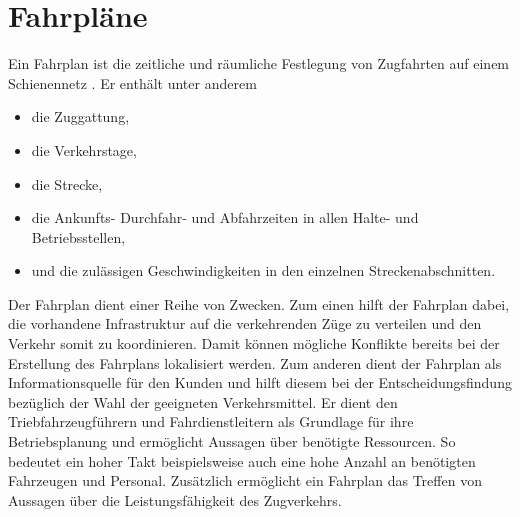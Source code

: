 \section{Fahrpläne}

Ein Fahrplan ist die zeitliche und räumliche Festlegung von Zugfahrten auf einem Schienennetz \cite{groger_simulation_2002}. Er enthält unter anderem
\begin{itemize}
    \item die Zuggattung,
    \item die Verkehrstage,
    \item die Strecke,
    \item die Ankunfts- Durchfahr- und Abfahrzeiten in allen Halte- und Betriebsstellen,
    \item und die zulässigen Geschwindigkeiten in den einzelnen Streckenabschnitten.
\end{itemize}
Der Fahrplan dient einer Reihe von Zwecken. Zum einen hilft der Fahrplan dabei, die vorhandene Infrastruktur auf die verkehrenden Züge zu verteilen und den Verkehr somit zu koordinieren. Damit können mögliche Konflikte bereits bei der Erstellung des Fahrplans lokalisiert werden. Zum anderen dient der Fahrplan als Informationsquelle für den Kunden und hilft diesem bei der Entscheidungsfindung bezüglich der Wahl der geeigneten Verkehrsmittel. Er dient den Triebfahrzeugführern und Fahrdienstleitern als Grundlage für ihre Betriebsplanung und ermöglicht Aussagen über benötigte Ressourcen. So bedeutet ein hoher Takt beispielsweise auch eine hohe Anzahl an benötigten Fahrzeugen und Personal. Zusätzlich ermöglicht ein Fahrplan das Treffen von Aussagen über die Leistungsfähigkeit des Zugverkehrs. \cite{groger_simulation_2002}
